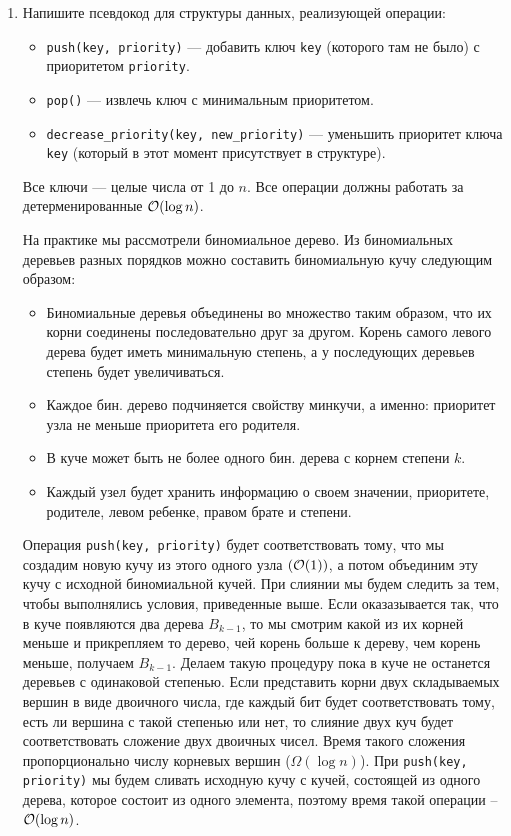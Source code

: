 \begin{enumerate}
  \item
    Напишите псевдокод для структуры данных, реализующей операции:
    \begin{itemize}
      \item \texttt{push(key, priority)} --- добавить ключ \texttt{key} (которого там не было) с приоритетом \texttt{priority}.
      \item \texttt{pop()} --- извлечь ключ с минимальным приоритетом.
      \item \texttt{decrease\_priority(key, new\_priority)} --- уменьшить приоритет ключа \texttt{key} (который в этот момент присутствует в структуре).
    \end{itemize}
    Все ключи --- целые числа от 1 до $n$. Все операции должны работать за детерменированные $\mathcal{O}(\log{n})$.
    \begin{solution}
      На практике мы рассмотрели биномиальное дерево. Из биномиальных деревьев разных порядков можно составить биномиальную кучу следующим образом:
      \begin{itemize}
        \item Биномиальные деревья объединены во множество таким образом, что их корни соединены последовательно друг за другом. Корень самого левого дерева будет иметь минимальную степень, а у последующих деревьев степень будет увеличиваться. 
        \item Каждое бин. дерево подчиняется свойству минкучи, а именно: приоритет узла не меньше приоритета его родителя.
        \item В куче может быть не более одного бин. дерева с корнем степени $k$.
        \item Каждый узел будет хранить информацию о своем значении, приоритете, родителе, левом ребенке, правом брате и степени.
      \end{itemize}

      Операция \texttt{push(key, priority)} будет соответствовать тому, что мы создадим новую кучу из этого одного узла $(\mathcal{O}(1))$, а потом объединим эту кучу с исходной биномиальной кучей. При слиянии мы будем следить за тем, чтобы выполнялись условия, приведенные выше. Если оказазывается так, что в куче появляются два дерева $B_{k-1}$, то мы смотрим какой из их корней меньше и прикрепляем то дерево, чей корень больше к дереву, чем корень меньше, получаем $B_{k-1}$. Делаем такую процедуру пока в куче не останется деревьев с одинаковой степенью. Если представить корни двух складываемых вершин в виде двоичного числа, где каждый бит будет соответствовать тому, есть ли вершина с такой степенью или нет, то слияние двух куч будет соответствовать сложение двух двоичных чисел. Время такого сложения пропорционально числу корневых вершин ($\Omega(\log{n})$). При \texttt{push(key, priority)} мы будем сливать исходную кучу с кучей, состоящей из одного дерева, которое состоит из одного элемента, поэтому время такой операции -- $\mathcal{O}(\log{n})$.


\end{solution}
\end{enumerate}
